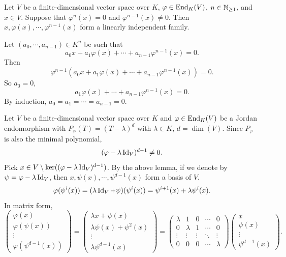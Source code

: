 \begin{lemmaenv}
    Let $V$ be a finite-dimensional vector space over $K$,
    $\varphi \in \operatorname{\mathrm{End}}_{K}(V)$, $n \in \mathbb{N}_{\ge 1}$, and $x \in V$.
    Suppose that $\varphi^n(x) = 0$ and $\varphi^{n-1}(x) \neq 0$.
    Then $x,\varphi(x), \cdots , \varphi^{n-1}(x)$ form a linearly independent family.
\end{lemmaenv}

\begin{proofenv}
    Let $(a_0,\cdots,a_{n-1}) \in K^n$ be such that
    $$a_0 x +a_1 \varphi(x) + \cdots + a_{n-1}\varphi^{n-1}(x) = 0.$$
    Then
    $$\varphi^{n-1}\left(a_0 x +a_1 \varphi(x) + \cdots + a_{n-1}\varphi^{n-1}(x)\right) = 0.$$
    So $a_0 = 0$,
    $$a_1 \varphi(x) + \cdots + a_{n-1}\varphi^{n-1}(x) = 0.$$
    By induction, $a_0 = a_1 = \cdots = a_{n-1} = 0$.
\end{proofenv}

\begin{remark}
    Let $V$ be a finite-dimensional vector space over $K$ and $\varphi \in \operatorname{\mathrm{End}}_{K}(V)$ be a Jordan endomorphism with $P_{\varphi}(T) = (T - \lambda)^d$ with $\lambda \in K$, $d = \dim(V)$.
    Since $P_{\varphi}$ is also the minimal polynomial,
    $$(\varphi - \lambda \operatorname{\mathrm{Id}}_{V})^{d - 1} \neq 0.$$
    Pick $x \in V \setminus \ker((\varphi - \lambda \operatorname{\mathrm{Id}}_{V})^{d - 1})$.
    By the above lemma, if we denote by $\psi = \varphi - \lambda \operatorname{\mathrm{Id}}_{V}$,
    then $x,\psi(x),\cdots,\psi^{d-1}(x)$ form a basis of $V$.
    $$\varphi(\psi^i(x)) = (\lambda\operatorname{\mathrm{Id}}_{V} + \psi)(\psi^i(x)) = \psi^{i+1}(x) + \lambda \psi^i(x).$$
    In matrix form,
    $$\begin{pmatrix}
        \varphi(x)\\
        \varphi(\psi(x))\\
        \vdots\\
        \varphi(\psi^{d-1}(x))
    \end{pmatrix} = 
    \begin{pmatrix}
        \lambda x + \psi(x)\\
        \lambda \psi(x) + \psi^2(x)\\
        \vdots\\
        \lambda \psi^{d-1}(x)
    \end{pmatrix}
    =
    \begin{pmatrix}
        \lambda & 1 & 0 & \cdots & 0\\
        0 & \lambda & 1 & \cdots & 0\\
        \vdots & \vdots & \vdots & \ddots & \vdots\\
        0 & 0 & 0 & \cdots & \lambda
    \end{pmatrix}
    \begin{pmatrix}
        x\\
        \psi(x)\\
        \vdots\\
        \psi^{d-1}(x)
    \end{pmatrix}.$$
\end{remark}


